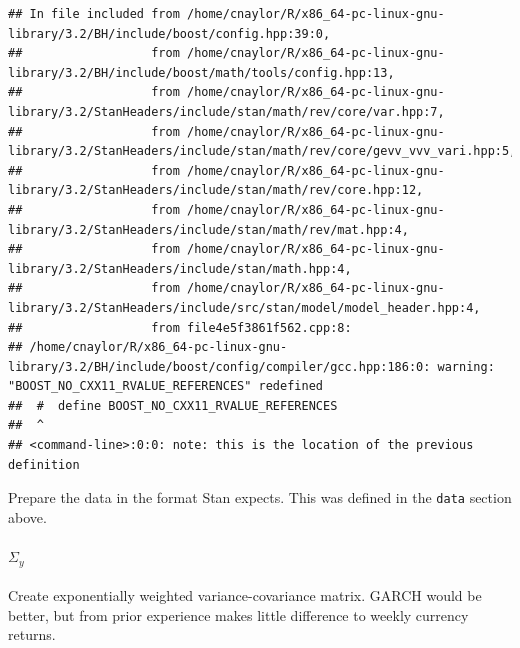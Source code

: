 \documentclass[]{article}
\let\oldparagraph\paragraph
\renewcommand{\paragraph}[1]{\oldparagraph{#1}\mbox{}}
\begin{document}
\begin{verbatim}
## In file included from /home/cnaylor/R/x86_64-pc-linux-gnu-library/3.2/BH/include/boost/config.hpp:39:0,
##                  from /home/cnaylor/R/x86_64-pc-linux-gnu-library/3.2/BH/include/boost/math/tools/config.hpp:13,
##                  from /home/cnaylor/R/x86_64-pc-linux-gnu-library/3.2/StanHeaders/include/stan/math/rev/core/var.hpp:7,
##                  from /home/cnaylor/R/x86_64-pc-linux-gnu-library/3.2/StanHeaders/include/stan/math/rev/core/gevv_vvv_vari.hpp:5,
##                  from /home/cnaylor/R/x86_64-pc-linux-gnu-library/3.2/StanHeaders/include/stan/math/rev/core.hpp:12,
##                  from /home/cnaylor/R/x86_64-pc-linux-gnu-library/3.2/StanHeaders/include/stan/math/rev/mat.hpp:4,
##                  from /home/cnaylor/R/x86_64-pc-linux-gnu-library/3.2/StanHeaders/include/stan/math.hpp:4,
##                  from /home/cnaylor/R/x86_64-pc-linux-gnu-library/3.2/StanHeaders/include/src/stan/model/model_header.hpp:4,
##                  from file4e5f3861f562.cpp:8:
## /home/cnaylor/R/x86_64-pc-linux-gnu-library/3.2/BH/include/boost/config/compiler/gcc.hpp:186:0: warning: "BOOST_NO_CXX11_RVALUE_REFERENCES" redefined
##  #  define BOOST_NO_CXX11_RVALUE_REFERENCES
##  ^
## <command-line>:0:0: note: this is the location of the previous definition
\end{verbatim}

Prepare the data in the format Stan expects. This was defined in the
\texttt{data} section above.

\paragraph{\texorpdfstring{\(\Sigma_y\)}{\textbackslash{}Sigma\_y}}\label{sigma_y}

Create exponentially weighted variance-covariance matrix. GARCH would be
better, but from prior experience makes little difference to weekly
currency returns.
\end{document}
